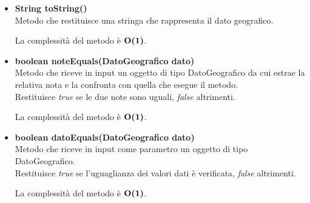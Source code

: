 \documentclass[a4paper, 12pt]{scrreprt}
\begin{document}
\begin{itemize}
				La complessit\`a del metodo \`e $\bigO\textbf{(1)}$.
				
				\item \textbf{String toString()}
				\\Metodo che restituisce una stringa che rappresenta il dato geografico.
				
				La complessit\`a del metodo \`e $\bigO\textbf{(1)}$.
				
				\item \textbf{boolean noteEquals(DatoGeografico dato)}
				\\Metodo che riceve in input un oggetto di tipo DatoGeografico da cui estrae la relativa nota e la confronta con quella che esegue il metodo.
				\\Restituisce \textit{true} se le due note sono uguali, \textit{false} altrimenti.
				
				La complessit\`a del metodo \`e $\bigO\textbf{(1)}$.
				
				\item \textbf{boolean datoEquals(DatoGeografico dato)}
				\\Metodo che riceve in input come parametro un oggetto di tipo DatoGeografico.
				\\Restituisce \textit{true} se l'uguaglianza dei valori dati \`e verificata, \textit{false} altrimenti.
				
				La complessit\`a del metodo \`e $\bigO\textbf{(1)}$.
				
			\end{itemize}
\end{document}
